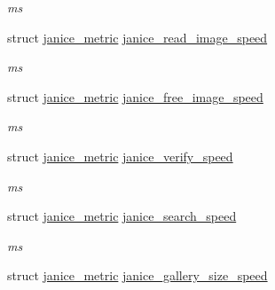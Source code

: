 \begin{DoxyCompactItemize}
\begin{DoxyCompactList}\small\item\em ms \end{DoxyCompactList}\item 
\hypertarget{structjanice__metrics_a37c312539a90b9c87951db18aed334a5}{}struct \hyperlink{structjanice__metric}{janice\+\_\+metric} \hyperlink{structjanice__metrics_a37c312539a90b9c87951db18aed334a5}{janice\+\_\+read\+\_\+image\+\_\+speed}\label{structjanice__metrics_a37c312539a90b9c87951db18aed334a5}

\begin{DoxyCompactList}\small\item\em ms \end{DoxyCompactList}\item 
\hypertarget{structjanice__metrics_aaa97bdc92c26fa38a1d120dd7ab9d8ba}{}struct \hyperlink{structjanice__metric}{janice\+\_\+metric} \hyperlink{structjanice__metrics_aaa97bdc92c26fa38a1d120dd7ab9d8ba}{janice\+\_\+free\+\_\+image\+\_\+speed}\label{structjanice__metrics_aaa97bdc92c26fa38a1d120dd7ab9d8ba}

\begin{DoxyCompactList}\small\item\em ms \end{DoxyCompactList}\item 
\hypertarget{structjanice__metrics_a0b3110f555aa6f496ad2733269c631ee}{}struct \hyperlink{structjanice__metric}{janice\+\_\+metric} \hyperlink{structjanice__metrics_a0b3110f555aa6f496ad2733269c631ee}{janice\+\_\+verify\+\_\+speed}\label{structjanice__metrics_a0b3110f555aa6f496ad2733269c631ee}

\begin{DoxyCompactList}\small\item\em ms \end{DoxyCompactList}\item 
\hypertarget{structjanice__metrics_a46dc6f2b00a50f0fbab73b16ea62f159}{}struct \hyperlink{structjanice__metric}{janice\+\_\+metric} \hyperlink{structjanice__metrics_a46dc6f2b00a50f0fbab73b16ea62f159}{janice\+\_\+search\+\_\+speed}\label{structjanice__metrics_a46dc6f2b00a50f0fbab73b16ea62f159}

\begin{DoxyCompactList}\small\item\em ms \end{DoxyCompactList}\item 
\hypertarget{structjanice__metrics_a7a917716648431e70eb077dbf95451e6}{}struct \hyperlink{structjanice__metric}{janice\+\_\+metric} \hyperlink{structjanice__metrics_a7a917716648431e70eb077dbf95451e6}{janice\+\_\+gallery\+\_\+size\+\_\+speed}\label{structjanice__metrics_a7a917716648431e70eb077dbf95451e6}


\end{DoxyCompactItemize}
